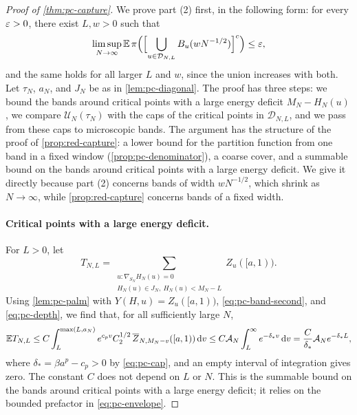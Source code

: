 \begin{proof}[Proof of \cref{thm:pc-capture}]
We prove part (2) first, in the following form: for every $\varepsilon>0$, there exist $L,w>0$ such that
\begin{equation}\label{eq:pc-micro-D}
\limsup_{N\to\infty}\mathbb E\,\pi\Bigl(\Bigl[\bigcup_{u\in\mathcal D_{N,L}}B_u(wN^{-1/2})\Bigr]^c\Bigr)\le\varepsilon,
\end{equation}
and the same holds for all larger $L$ and $w$, since the union increases with both. Let $\tau_N$, $a_N$, and $J_N$ be as in \cref{lem:pc-diagonal}. The proof has three steps: we bound the bands around critical points with a large energy deficit $M_N-H_N(u)$, we compare $\mathcal U_N(\tau_N)$ with the caps of the critical points in $\mathcal D_{N,L}$, and we pass from these caps to microscopic bands. The argument has the structure of the proof of \cref{prop:red-capture}: a lower bound for the partition function from one band in a fixed window (\cref{prop:pc-denominator}), a coarse cover, and a summable bound on the bands around critical points with a large energy deficit. We give it directly because part (2) concerns bands of width $wN^{-1/2}$, which shrink as $N\to\infty$, while \cref{prop:red-capture} concerns bands of a fixed width.

\paragraph{Critical points with a large energy deficit.}
For $L>0$, let
\[
T_{N,L}=\sum_{\substack{u:\nabla_{S_N}H_N(u)=0\\H_N(u)\in J_N,\ H_N(u)<M_N-L}}Z_u([a,1)).
\]
Using \cref{lem:pc-palm} with $Y(H,u)=Z_u([a,1))$, \eqref{eq:pc-band-second}, and \eqref{eq:pc-depth}, we find that, for all sufficiently large $N$,
\begin{equation}\label{eq:pc-deep}
\mathbb E T_{N,L}\le C\int_L^{\max(L,a_N)}e^{c_pv}C_2^{1/2}\,\overline Z_{N,M_N-v}([a,1))\,\mathrm d v\le C\mathcal A_N\int_L^\infty e^{-\delta_*v}\,\mathrm d v=\frac C{\delta_*}\mathcal A_Ne^{-\delta_*L},
\end{equation}
where $\delta_*=\beta a^p-c_p>0$ by \eqref{eq:pc-cap}, and an empty interval of integration gives zero. The constant $C$ does not depend on $L$ or $N$. This is the summable bound on the bands around critical points with a large energy deficit; it relies on the bounded prefactor in \eqref{eq:pc-envelope}.


\end{proof}
